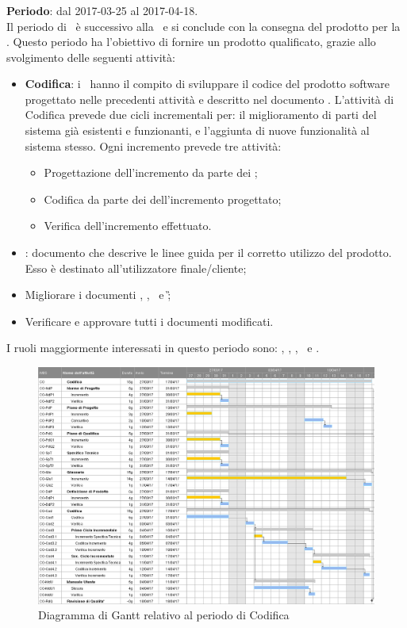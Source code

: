 		\subsubsection{\CO}
		\textbf{Periodo}: dal 2017-03-25 al 2017-04-18.\\
		Il periodo di \CO\ è successivo alla \PD\ e si conclude con la consegna del prodotto per la \RQ. Questo periodo ha l'obiettivo di fornire un prodotto qualificato, grazie allo svolgimento delle seguenti attività:
		\begin{itemize}
			\item \textbf{Codifica}: i \textit{\Progrs}\ hanno il compito di sviluppare il codice del prodotto software progettato nelle precedenti attività e descritto nel documento \DDP. L’attività di Codifica prevede due cicli incrementali per: il miglioramento
			di parti del sistema già esistenti e funzionanti, e l’aggiunta di nuove funzionalità al sistema stesso.
			Ogni incremento prevede tre attività:
			\begin{itemize}
				\item Progettazione dell’incremento da parte dei \textit{\Progs};
				\item Codifica da parte dei \textit{\Progrs} dell’incremento progettato;
				\item Verifica dell’incremento effettuato.
			\end{itemize}
			\item \textit{\MU}: documento che descrive le linee guida per il corretto utilizzo del prodotto. Esso è destinato all’utilizzatore finale/cliente;
			\item  Migliorare i documenti \NdP, \PdP, \PdQ\ e \G;
			\item Verificare e approvare tutti i documenti modificati.
		\end{itemize}
		I ruoli maggiormente interessati in questo periodo sono: \textit{\Amm}, \textit{\Res}, \textit{\Prog}, \textit{\Progr}\ e \textit{\Ver}.
		
		\begin{figure}[ht]
			\centering
			\includegraphics[scale=0.40]{img/ganttnetbreak5.png}
			\caption{Diagramma di Gantt relativo al periodo di Codifica}
		\end{figure}
		\FloatBarrier
		
